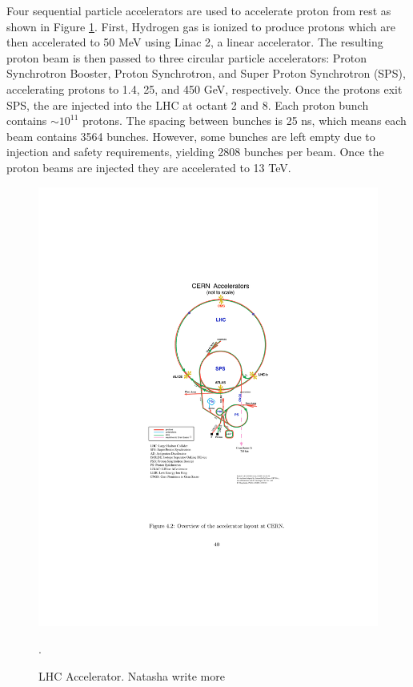 Four sequential particle accelerators are used to accelerate proton from rest as shown in Figure \ref{fig:lhc_accel}. First, Hydrogen gas is ionized to produce protons which are then accelerated to 50 MeV using Linac 2, a linear accelerator. The resulting proton beam is then passed to three circular particle accelerators: Proton Synchrotron Booster, Proton Synchrotron, and Super Proton Synchrotron (SPS), accelerating protons to 1.4, 25, and 450 GeV, respectively. Once the protons exit SPS, the are injected into the LHC at octant 2 and 8. Each proton bunch contains $\sim 10^{11}$ protons. The spacing between bunches is 25 ns, which means each beam contains 3564 bunches. However, some bunches are left empty due to injection and safety requirements, yielding 2808 bunches per beam. Once the proton beams are injected they are accelerated to 13 TeV. 


\begin{figure}[h!]
  \centering
  \includegraphics[width=\hsize]{figures/Detector/lhc_accel.pdf}
  \caption{LHC Accelerator. Natasha write more}. 
  \label{fig:lhc_accel}
\end{figure}
\FloatBarrier


